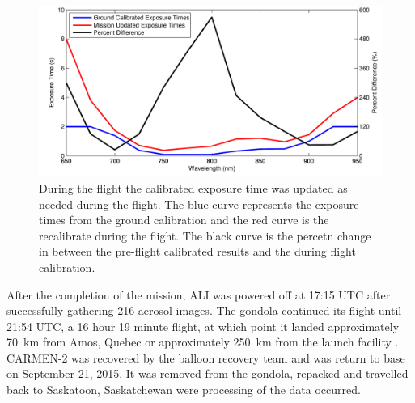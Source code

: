 \begin{figure}
    \includegraphics[width=1.0\textwidth]{./Images/5-1-ExposureTimeComparisons.pdf}
    \caption[Exposure Time Update During Balloon Flight]{During the flight the calibrated exposure time was updated as needed during the flight. The blue curve represents the exposure times from the ground calibration and the red curve is the recalibrate during the flight. The black curve is the percetn change in between the pre-flight calibrated results and the during flight calibration.}
    \label{fig:5.1:exposureTimeComparisons}
\end{figure}

After the completion of the mission, ALI was powered off at 17:15 UTC after successfully gathering 216 aerosol images. The gondola continued its flight until 21:54 UTC, a 16 hour 19 minute flight, at which point it landed approximately 70~km from Amos, Quebec or approximately 250~km from the launch facility . CARMEN-2 was recovered by the balloon recovery team and was return to base on September 21, 2015. It was removed from the gondola, repacked and travelled back to Saskatoon, Saskatchewan were processing of the data occurred. 
